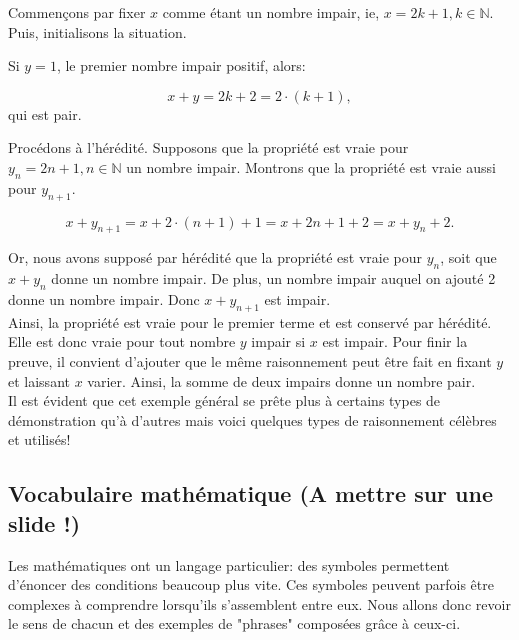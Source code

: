\documentclass[a4paper, 12pt, french, twoside]{article}
\newcommand{\Nn}{{\mathbb{N}}}
\begin{document}
Commençons par fixer $x$ comme étant un nombre impair, ie, $x=2k+1, k\in \Nn$. Puis, initialisons la situation.

Si $y=1$, le premier nombre impair positif, alors:

\begin{equation}
    x+y=2k+2=2\cdot(k+1),
\end{equation}
qui est pair.

Procédons à l'hérédité. Supposons que la propriété est vraie pour $y_n=2n+1, n\in \Nn$ un nombre impair. Montrons que la propriété est vraie aussi pour $y_{n+1}$.

\begin{equation}
    x+y_{n+1}=x+2\cdot(n+1)+1=x+2n+1+2=x+y_n +2.
\end{equation}

Or, nous avons supposé par hérédité que la propriété est vraie pour $y_n$, soit que $x+y_n$ donne un nombre impair. De plus, un nombre impair auquel on ajouté 2 donne un nombre impair. Donc $x+y_{n+1}$ est impair. \\

Ainsi, la propriété est vraie pour le premier terme et est conservé par hérédité. Elle est donc vraie pour tout nombre $y$ impair si $x$ est impair. Pour finir la preuve, il convient d'ajouter que le même raisonnement peut être fait en fixant $y$ et laissant $x$ varier. Ainsi, la somme de deux impairs donne un nombre pair. \\
Il est évident que cet exemple général se prête plus à certains types de démonstration qu'à d'autres mais voici quelques types de raisonnement célèbres et utilisés! 
\subsection{Vocabulaire mathématique (A mettre sur une slide !)}

Les mathématiques ont un langage particulier: des symboles permettent d'énoncer des conditions beaucoup plus vite. Ces symboles peuvent parfois être complexes à comprendre lorsqu'ils s'assemblent entre eux. Nous allons donc revoir le sens de chacun et des exemples de "phrases" composées grâce à ceux-ci.
\end{document}
